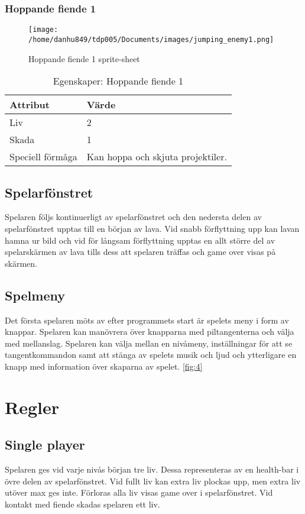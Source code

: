 \documentclass{TDP005mall}
\begin{document}
\subsubsection*{Hoppande fiende 1}
\begin{figure}[h!]
   \caption{Hoppande fiende 1 sprite-sheet\label{fig:3}}
  \centerline{\texttt{[image: /home/danhu849/tdp005/Documents/images/jumping\_enemy1.png]}}
\end{figure}

\begin{table}[h!]
  \centering
  \caption{Egenskaper: Hoppande fiende 1\label{tab:4}}
\begin{tabular}{|l|l|}
\hline
Attribut & Värde \\\hline
Liv & 2 \\\hline
Skada & 1 \\\hline
Speciell förmåga & Kan hoppa och skjuta projektiler. \\\hline
\end{tabular}
\end{table}

\subsection{Spelarfönstret}
Spelaren följs kontinuerligt av spelarfönstret och den nedersta delen av spelarfönstret upptas till en början av lava. Vid snabb förflyttning upp kan lavan hamna ur bild och vid för långsam förflyttning upptas en allt större del av spelarskärmen av lava tills dess att spelaren träffas och game over visas på skärmen.


\subsection{Spelmeny}
Det första spelaren möts av efter programmets start är spelets meny i form av knappar. Spelaren kan manövrera över knapparna med piltangenterna och välja med mellanslag. Spelaren kan välja mellan en nivåmeny, inställningar för att se tangentkommandon samt att stänga av spelets musik och ljud och ytterligare en knapp med information över skaparna av spelet.  \ref{fig:4} 

\section{Regler}%

\subsection{Single player}
Spelaren ges vid varje nivås början tre liv. Dessa representeras av en health-bar i övre delen av spelarfönstret. Vid fullt liv kan extra liv plockas upp, men extra liv utöver max ges inte. Förloras alla liv visas game over i spelarfönstret. Vid kontakt med fiende skadas spelaren ett liv.
\end{document}
